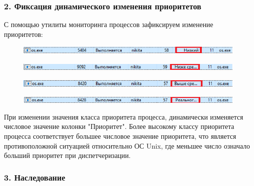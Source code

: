 \documentclass[14pt,a4paper,report]{report}
\begin{document}
\subsubsection{2. Фиксация динамического изменения приоритетов}

С помощью утилиты мониторинга процессов зафиксируем изменение приоритетов:

\begin{figure}[h!]
	\centering
	\includegraphics[scale = 0.95]{images/p4_2_l.png}
	
	\caption{}
	\label{image:6}
\end{figure}

\begin{figure}[h!]
	\centering
	\includegraphics[scale = 0.95]{images/p4_2_b.png}
	
	\caption{}
	\label{image:7}
\end{figure}

\begin{figure}[h!]
	\centering
	\includegraphics[scale = 0.95]{images/p4_2_a.png}
	
	\caption{}
	\label{image:8}
\end{figure}

\begin{figure}[h!]
	\centering
	\includegraphics[scale = 0.95]{images/p4_2_r.png}
	
	\caption{}
	\label{image:9}
\end{figure}

При изменении значения класса приоритета процесса, динамически изменяется числовое значение колонки "Приоритет". Более высокому классу приоритета процесса соответствует большее числовое значение приоритета, что является противоположной ситуацией относительно ОС Unix, где меньшее число означало больший приоритет при диспетчеризации.

\subsubsection{3. Наследование}
\end{document}
